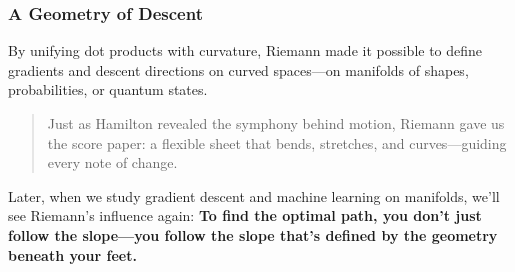 \subsubsection*{A Geometry of Descent}

By unifying dot products with curvature, Riemann made it possible to define gradients and descent directions on curved spaces—on manifolds of shapes, probabilities, or quantum states.

\begin{quote}
Just as Hamilton revealed the symphony behind motion,  
Riemann gave us the score paper: a flexible sheet that bends, stretches, and curves—guiding every note of change.
\end{quote}

Later, when we study gradient descent and machine learning on manifolds, we’ll see Riemann’s influence again:  
\textbf{To find the optimal path, you don’t just follow the slope—you follow the slope that’s defined by the geometry beneath your feet.}
